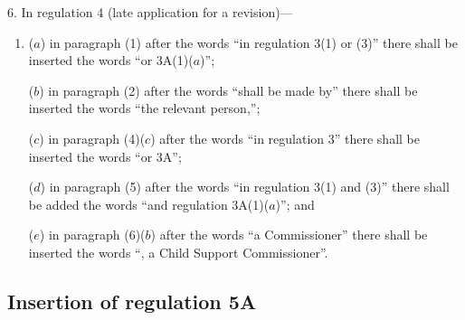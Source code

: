 \documentclass[12pt,a4paper]{article}
\begin{document}
6.  In regulation 4 (late application for a revision)—
\begin{enumerate}\item[]
($a$) in paragraph (1) after the words “in regulation 3(1) or (3)” there shall be inserted the words “or 3A(1)($a$)”;

($b$) in paragraph (2) after the words “shall be made by” there shall be inserted the words “the relevant person,”;

($c$) in paragraph (4)($c$)  after the words “in regulation 3” there shall be inserted the words “or 3A”;

($d$) in paragraph (5) after the words “in regulation 3(1) and (3)” there shall be added the words “and regulation 3A(1)($a$)”; and

($e$) in paragraph (6)($b$)  after the words “a Commissioner” there shall be inserted the words “, a Child Support Commissioner”.
\end{enumerate}

\subsection[7. Insertion of regulation 5A]{Insertion of regulation 5A}
\end{document}
